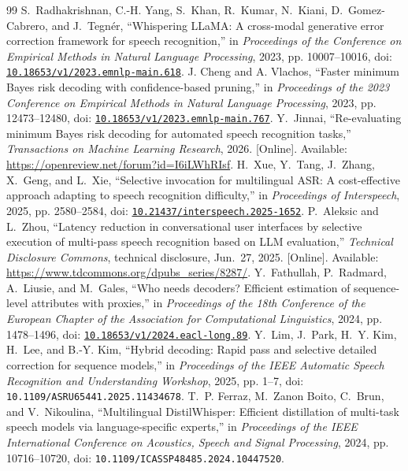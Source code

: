 \begin{thebibliography}{99}
S.~Radhakrishnan, C.-H. Yang, S.~Khan, R.~Kumar, N.~Kiani, D.~Gomez-Cabrero, and J.~Tegnér, ``{Whispering LLaMA: A cross-modal generative error correction framework for speech recognition},'' in \emph{Proceedings of the Conference on Empirical Methods in Natural Language Processing}, 2023, pp. 10007--10016, doi: \href{https://doi.org/10.18653/v1/2023.emnlp-main.618}{\nolinkurl{10.18653/v1/2023.emnlp-main.618}}.
J. Cheng and A. Vlachos, ``Faster minimum Bayes risk decoding with confidence-based pruning,'' in \emph{Proceedings of the 2023 Conference on Empirical Methods in Natural Language Processing}, 2023, pp. 12473--12480, doi: \href{https://doi.org/10.18653/v1/2023.emnlp-main.767}{\nolinkurl{10.18653/v1/2023.emnlp-main.767}}.
\BIBentryALTinterwordspacing
Y.~Jinnai, ``Re-evaluating minimum Bayes risk decoding for automated speech recognition tasks,'' \emph{Transactions on Machine Learning Research}, 2026. [Online]. Available: \url{https://openreview.net/forum?id=I6iLWhRIsf}.
\BIBentrySTDinterwordspacing
{}
H.~Xue, Y.~Tang, J.~Zhang, X.~Geng, and L.~Xie, ``{Selective invocation for multilingual ASR: A cost-effective approach adapting to speech recognition difficulty},'' in \emph{Proceedings of Interspeech}, 2025, pp. 2580--2584, doi: \href{https://doi.org/10.21437/interspeech.2025-1652}{\nolinkurl{10.21437/interspeech.2025-1652}}.
P.~Aleksic and L.~Zhou, ``Latency reduction in conversational user interfaces by selective execution of multi-pass speech recognition based on LLM evaluation,'' \emph{Technical Disclosure Commons}, technical disclosure, Jun.~27, 2025. [Online]. Available: \url{https://www.tdcommons.org/dpubs_series/8287/}.
Y.~Fathullah, P.~Radmard, A.~Liusie, and M.~Gales, ``Who needs decoders? Efficient estimation of sequence-level attributes with proxies,'' in \emph{Proceedings of the 18th Conference of the European Chapter of the Association for Computational Linguistics}, 2024, pp. 1478--1496, doi: \href{https://doi.org/10.18653/v1/2024.eacl-long.89}{\nolinkurl{10.18653/v1/2024.eacl-long.89}}.
Y.~Lim, J.~Park, H.~Y. Kim, H.~Lee, and B.-Y. Kim, ``Hybrid decoding: Rapid pass and selective detailed correction for sequence models,'' in \emph{Proceedings of the IEEE Automatic Speech Recognition and Understanding Workshop}, 2025, pp. 1--7, doi: \nolinkurl{10.1109/ASRU65441.2025.11434678}.
T.~P. Ferraz, M.~Zanon Boito, C.~Brun, and V.~Nikoulina, ``Multilingual DistilWhisper: Efficient distillation of multi-task speech models via language-specific experts,'' in \emph{Proceedings of the IEEE International Conference on Acoustics, Speech and Signal Processing}, 2024, pp. 10716--10720, doi: \nolinkurl{10.1109/ICASSP48485.2024.10447520}.

\end{thebibliography}
